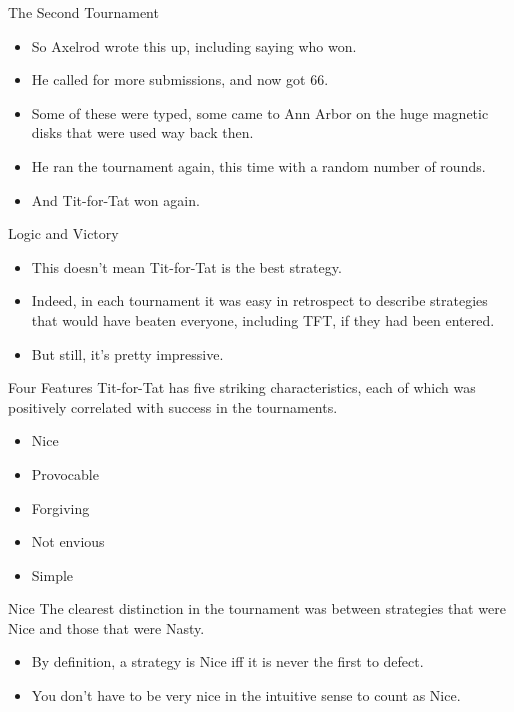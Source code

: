 \documentclass[
  ignorenonframetext,
]{beamer}
\providecommand{\tightlist}{%
  \setlength{\itemsep}{0pt}\setlength{\parskip}{0pt}}
\begin{document}
\begin{frame}{The Second Tournament}
\protect\hypertarget{the-second-tournament}{}
\begin{itemize}
\tightlist
\item
  So Axelrod wrote this up, including saying who won.
\item
  He called for more submissions, and now got 66.
\item
  Some of these were typed, some came to Ann Arbor on the huge magnetic
  disks that were used way back then.
\item
  He ran the tournament again, this time with a random number of rounds.
  \pause
\item
  And Tit-for-Tat won again.
\end{itemize}
\end{frame}

\begin{frame}{Logic and Victory}
\protect\hypertarget{logic-and-victory}{}
\begin{itemize}
\tightlist
\item
  This doesn't mean Tit-for-Tat is the best strategy.
\item
  Indeed, in each tournament it was easy in retrospect to describe
  strategies that would have beaten everyone, including TFT, if they had
  been entered.
\item
  But still, it's pretty impressive.
\end{itemize}
\end{frame}

\begin{frame}{Four Features}
\protect\hypertarget{four-features}{}
Tit-for-Tat has five striking characteristics, each of which was
positively correlated with success in the tournaments.

\begin{itemize}
\tightlist
\item
  Nice
\item
  Provocable
\item
  Forgiving
\item
  Not envious
\item
  Simple
\end{itemize}
\end{frame}

\begin{frame}{Nice}
\protect\hypertarget{nice}{}
The clearest distinction in the tournament was between strategies that
were Nice and those that were Nasty.

\begin{itemize}
\tightlist
\item
  By definition, a strategy is Nice iff it is never the first to defect.
\item
  You don't have to be very nice in the intuitive sense to count as
  Nice.
\end{itemize}
\end{frame}
\end{document}
